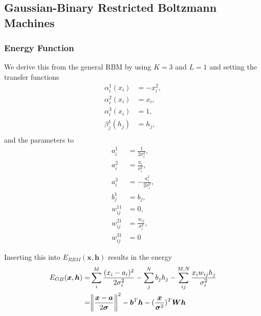 \documentclass[twoside,english]{uiofysmaster}
\DeclarePairedDelimiter{\norm}{\lVert}{\rVert}
\begin{document}
\subsection{Gaussian-Binary Restricted Boltzmann Machines}
\subsubsection{Energy Function}
We derive this from the general RBM by using $K=3$ and $L=1$ and setting the transfer functions 
\begin{align}
	\alpha_i^1 (x_i) &= -x_i^2 , \\
	\alpha_i^2 (x_i) &= x_i , \\
	\alpha_i^3 (x_i) &= 1 , \\
	\beta_j^1 (h_j) &= h_j , \\
\end{align}
and the parameters to
\begin{align}
	a_i^1 &= \frac{1}{2\sigma_i^2} , \\
	a_i^2 &= \frac{a_i}{\sigma_i^2} , \\ 
	a_i^3 &= -\frac{a_i^2}{2\sigma_i^2} , \\
	b_j^1 &= b_j , \\
	w_{ij}^{11} &= 0 , \\
	w_{ij}^{21} &= \frac{w_{ij}}{\sigma_i^2} , \\
	w_{ij}^{31} &= 0
\end{align}


Inserting this into $E_{RBM}(\bm{x},\bm{h})$ results in the energy
\begin{align}
	E_{GB}(\bm{x}, \bm{h}) =& \sum_i^M \frac{(x_i - a_i)^2}{2\sigma_i^2}
	- \sum_j^N b_j h_j 
	-\sum_{ij}^{M,N} \frac{x_i w_{ij} h_j}{\sigma_i^2} \nonumber \\
	=& \norm*{\frac{\bm{x} -\bm{a}}{2\bm{\sigma}}}^2 - \bm{b}^T \bm{h} 
	- (\frac{\bm{x}}{\bm{\sigma}^2})^T \bm{W}\bm{h}
\end{align}
\end{document}
